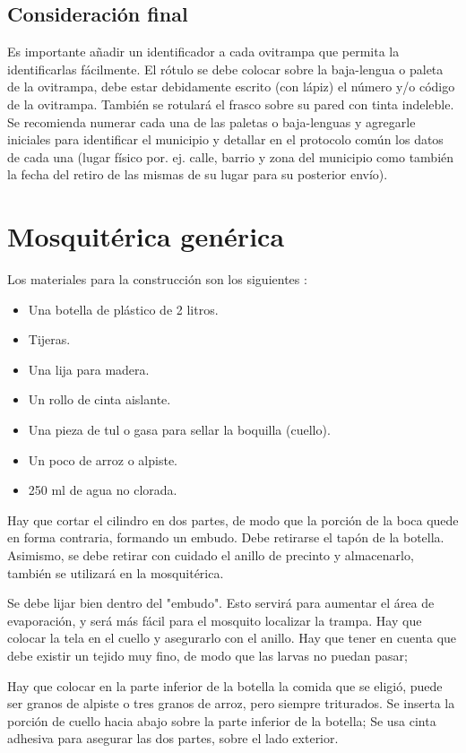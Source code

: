 \subsection{Consideración final}
Es importante añadir un identificador a cada ovitrampa que permita la
identificarlas fácilmente. El rótulo se debe colocar sobre la baja-lengua
o paleta de la ovitrampa, debe estar debidamente escrito (con lápiz) el
número y/o código de la ovitrampa. También se rotulará el frasco sobre
su pared con tinta indeleble. Se recomienda numerar cada una de las paletas
o baja-lenguas y agregarle iniciales para identificar el municipio y
detallar en el protocolo común los datos de cada una (lugar físico por.
ej. calle, barrio y zona del municipio como también la fecha del retiro
de las mismas de su lugar para su posterior envío).

\section{Mosquitérica genérica}

Los materiales para la construcción son los siguientes :
\begin{itemize}
    \item Una botella de plástico de 2 litros.
    \item Tijeras.
    \item Una lija para madera.
    \item Un rollo de cinta aislante.
    \item Una pieza de tul o gasa para sellar la boquilla (cuello).
    \item Un poco de arroz o alpiste.
    \item 250 ml de agua no clorada.
\end{itemize}

Hay que cortar el cilindro en dos partes, de modo que la porción de la
boca quede en forma contraria, formando un embudo. Debe retirarse el tapón
de la botella. Asimismo, se debe retirar con cuidado el anillo de precinto
y almacenarlo, también se utilizará en la mosquitérica.

Se debe lijar bien dentro del "embudo". Esto servirá para aumentar el área
de evaporación, y será más fácil para el mosquito localizar la  trampa.
Hay que colocar la  tela en el cuello y asegurarlo con el anillo. Hay que
tener en cuenta que debe existir un tejido muy fino, de modo que las larvas
no puedan pasar;


Hay que colocar en la parte inferior de la botella la comida que se eligió,
puede ser granos de alpiste o tres granos de arroz, pero siempre triturados.
Se inserta la porción de cuello hacia abajo sobre la parte inferior de la
botella; Se usa cinta adhesiva para asegurar las dos partes, sobre el lado
exterior.

